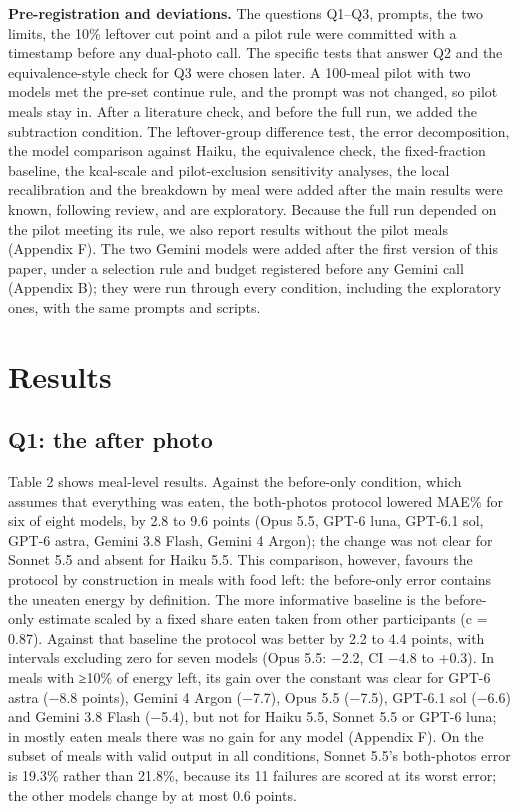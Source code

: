 \documentclass[
  11pt,
  letterpaper]{article}
\begin{document}
\textbf{Pre-registration and deviations.} The questions Q1--Q3, prompts, the two limits, the 10\% leftover cut
point and a pilot rule were committed with a timestamp before any dual-photo call. The specific tests that
answer Q2 and the equivalence-style check for Q3 were chosen later. A 100-meal pilot with two models met the
pre-set continue rule, and the prompt was not changed, so pilot meals stay in. After a literature check, and
before the full run, we added the subtraction condition. The leftover-group difference test, the error
decomposition, the model comparison against Haiku, the equivalence check, the fixed-fraction baseline, the
kcal-scale and pilot-exclusion sensitivity analyses, the local recalibration and the breakdown by meal were
added after the main results were known, following review, and are exploratory. Because the full run depended
on the pilot meeting its rule, we also report results without the pilot meals (Appendix F). The two Gemini
models were added after the first version of this paper, under a selection rule and budget registered before
any Gemini call (Appendix B); they were run through every condition, including the exploratory ones, with the
same prompts and scripts.

\section{Results}\label{results}

\subsection{Q1: the after photo}\label{q1-the-after-photo}

Table 2 shows meal-level results. Against the before-only condition, which assumes that everything was eaten,
the both-photos protocol lowered MAE\% for six of eight models, by 2.8 to 9.6 points (Opus 5.5, GPT-6 luna,
GPT-6.1 sol, GPT-6 astra, Gemini 3.8 Flash, Gemini 4 Argon); the change was not clear for Sonnet 5.5 and
absent for Haiku 5.5. This comparison, however, favours the protocol by construction in meals with food left:
the before-only error contains the uneaten energy by definition. The more informative baseline is the
before-only estimate scaled by a fixed share eaten taken from other participants (c = 0.87). Against that
baseline the protocol was better by 2.2 to 4.4 points, with intervals excluding zero for seven models (Opus
5.5: −2.2, CI −4.8 to +0.3). In meals with ≥10\% of energy left, its gain over the constant was clear for
GPT-6 astra (−8.8 points), Gemini 4 Argon (−7.7), Opus 5.5 (−7.5), GPT-6.1 sol (−6.6) and Gemini 3.8 Flash
(−5.4), but not for Haiku 5.5, Sonnet 5.5 or GPT-6 luna; in mostly eaten meals there was no gain for any model
(Appendix F). On the subset of meals with valid output in all conditions, Sonnet 5.5's both-photos error is
19.3\% rather than 21.8\%, because its 11 failures are scored at its worst error; the other models change by
at most 0.6 points.
\end{document}
